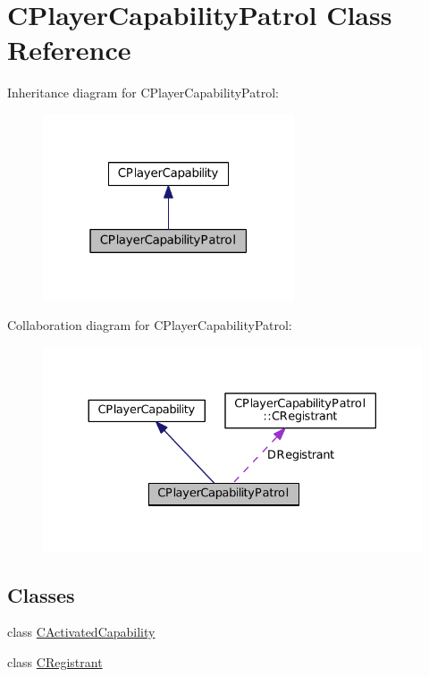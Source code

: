 \hypertarget{classCPlayerCapabilityPatrol}{}\section{C\+Player\+Capability\+Patrol Class Reference}
\label{classCPlayerCapabilityPatrol}


Inheritance diagram for C\+Player\+Capability\+Patrol\+:\nopagebreak
\begin{figure}[H]
\begin{center}
\leavevmode
\includegraphics[width=211pt]{classCPlayerCapabilityPatrol__inherit__graph}
\end{center}
\end{figure}


Collaboration diagram for C\+Player\+Capability\+Patrol\+:\nopagebreak
\begin{figure}[H]
\begin{center}
\leavevmode
\includegraphics[width=330pt]{classCPlayerCapabilityPatrol__coll__graph}
\end{center}
\end{figure}
\subsection*{Classes}
\begin{DoxyCompactItemize}
\item 
class \hyperlink{classCPlayerCapabilityPatrol_1_1CActivatedCapability}{C\+Activated\+Capability}
\item 
class \hyperlink{classCPlayerCapabilityPatrol_1_1CRegistrant}{C\+Registrant}
\end{DoxyCompactItemize}
